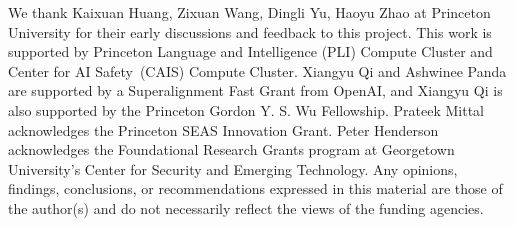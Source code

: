 We thank Kaixuan Huang, Zixuan Wang, Dingli Yu, Haoyu Zhao at Princeton University for their early discussions and feedback to this project. This work is supported by Princeton Language and Intelligence (PLI) Compute Cluster and Center for AI Safety~(CAIS) Compute Cluster. Xiangyu Qi and Ashwinee Panda are supported by a Superalignment Fast Grant from OpenAI, and Xiangyu Qi is also supported by the Princeton Gordon Y. S. Wu Fellowship. Prateek Mittal acknowledges the Princeton SEAS Innovation Grant. Peter Henderson acknowledges the Foundational Research Grants program at Georgetown University’s Center for Security and Emerging Technology. Any opinions, findings, conclusions, or recommendations expressed in this material are those of the author(s) and do not necessarily reflect the views of the funding agencies.






